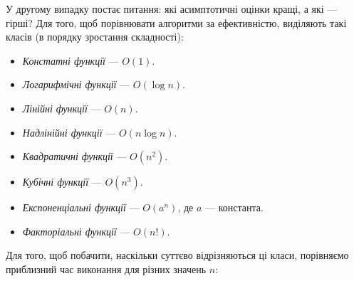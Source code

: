 \documentclass[12pt,a4paper]{report}
\begin{document}
У другому випадку постає питання: які асимптотичні оцінки кращі, а які --- гірші? Для того, щоб порівнювати алгоритми за ефективністю, виділяють такі \nextitemizecount{} класів (в порядку зростання складності):

\begin{itemize}
    \item \emph{Констатні функції} --- \(O(1)\).
    \item \emph{Логарифмічні функції} --- \(O(\log{}n)\).
    \item \emph{Лінійні функції} --- \(O(n)\).
    \item \emph{Надлінійні функції} --- \(O(n\log{}n)\).
    \item \emph{Квадратичні функції} --- \(O(n^2)\).
    \item \emph{Кубічні функції} --- \(O(n^3)\).
    \item \emph{Експоненціальні функції} --- \(O(a^n)\), де \(a\) --- константа.
    \item \emph{Факторіальні функції} --- \(O(n!)\).
\end{itemize}

Для того, щоб побачити, наскільки суттєво відрізняються ці класи, порівняємо приблизний час виконання для різних значень \(n\):
\end{document}
